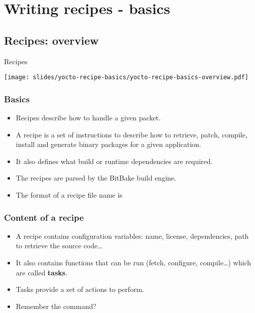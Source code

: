 \section{Writing recipes - basics}

\subsection{Recipes: overview}

\begin{frame}{Recipes}
  \begin{center}
    \texttt{[image: slides/yocto-recipe-basics/yocto-recipe-basics-overview.pdf]}
  \end{center}
\end{frame}

\begin{frame}
  \frametitle{Basics}
  \begin{itemize}
    \item Recipes describe how to handle a given packet.
    \item A recipe is a set of instructions to describe how to
      retrieve, patch, compile, install and generate binary packages
      for a given application.
    \item It also defines what build or runtime dependencies are
      required.
    \item The recipes are parsed by the BitBake build engine.
    \item The format of a recipe file name is
  \end{itemize}
\end{frame}

\begin{frame}
  \frametitle{Content of a recipe}
  \begin{itemize}
    \item A recipe contains configuration variables: name, license,
      dependencies, path to retrieve the source code\dots
    \item It also contains functions that can be run (fetch,
      configure, compile\dots) which are called {\bf tasks}.
    \item Tasks provide a set of actions to perform.
    \item Remember the  command?
  \end{itemize}
\end{frame}

